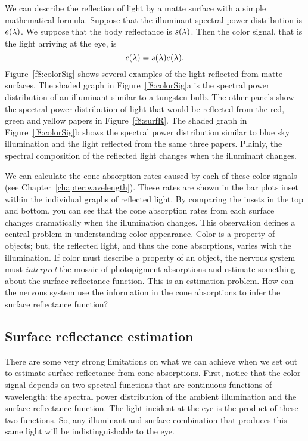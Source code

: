 We can describe the reflection of light by a matte surface with a
simple mathematical formula.  Suppose that the illuminant spectral
power distribution is $\mbox{$e(\lambda)$}$.  We suppose that the body
reflectance is $\mbox{$s(\lambda)$}$.  Then the color signal, that is the
light arriving at the eye, is
\[
\mbox{$c(\lambda)$} = \mbox{$s(\lambda)$} \mbox{$e(\lambda)$} .
\]
Figure~\ref{f8:colorSig} shows several examples of the light reflected
from matte surfaces.  The shaded graph in Figure~\ref{f8:colorSig}a is
the spectral power distribution of an illuminant similar to a tungsten
bulb.  The other panels show the spectral power distribution of
light that would be reflected from the red, green and yellow papers in
Figure~\ref{f8:surfR}.  The shaded graph in Figure~\ref{f8:colorSig}b
shows the spectral power distribution similar to blue sky illumination
and the light reflected from the same three papers.  Plainly, the
spectral composition of the reflected light changes when the
illuminant changes.

We can calculate the cone absorption rates caused by each of these
color signals (see Chapter~\ref{chapter:wavelength}).  These rates are
shown in the bar plots inset within the individual graphs of reflected
light.  By comparing the insets in the top and bottom, you can see
that the cone absorption rates from each surface changes dramatically
when the illumination changes.  This observation defines a central
problem in understanding color appearance.  Color is a property of
objects; but, the reflected light, and thus the cone absorptions,
varies with the illumination.  If color must describe a property of an
object, the nervous system must {\em interpret} the mosaic of
photopigment absorptions and estimate something about the surface
reflectance function.  This is an estimation problem.  How can the
nervous system use the information in the cone absorptions to infer
the surface reflectance function?

\subsection*{Surface reflectance estimation}
There are some very strong limitations on what we can achieve when we
set out to estimate surface reflectance from cone absorptions. First,
notice that the color signal depends on two spectral functions that
are continuous functions of wavelength: the spectral power
distribution of the ambient illumination and the surface reflectance
function.  The light incident at the eye is the product of these two
functions.  So, any illuminant and surface combination that produces
this same light will be indistinguishable to the eye.

